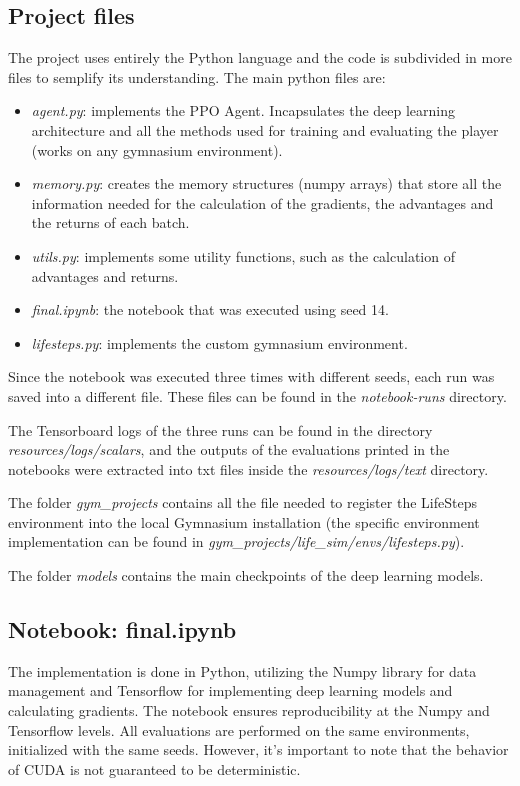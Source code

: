 \documentclass{article}
\begin{document}
\subsection{Project files}
The project uses entirely the Python language and the code is subdivided in more files to semplify its understanding. The main python files are:

\begin{itemize}
    \item \textit{agent.py}: implements the PPO Agent. Incapsulates the deep learning architecture and all the methods used for training and evaluating the player (works on any gymnasium environment).
    
    \item \textit{memory.py}: creates the memory structures (numpy arrays) that store all the information needed for the calculation of the gradients, the advantages and the returns of each batch.
    
    \item \textit{utils.py}: implements some utility functions, such as the calculation of advantages and returns.
    
    \item \textit{final.ipynb}: the notebook that was executed using seed 14.

    \item \textit{lifesteps.py}: implements the custom gymnasium environment.
\end{itemize}

Since the notebook was executed three times with different seeds, each run was saved into a different file. These files can be found in the \textit{notebook-runs} directory.

The Tensorboard logs of the three runs can be found in the directory \textit{resources/logs/scalars}, and the outputs of the evaluations printed in the notebooks were extracted into txt files inside the \textit{resources/logs/text} directory.

The folder \textit{gym\_projects} contains all the file needed to register the LifeSteps environment into the local Gymnasium installation (the specific environment implementation can be found in \textit{gym\_projects/life\_sim/envs/lifesteps.py}). 

The folder \textit{models} contains the main checkpoints of the deep learning models.

\subsection{Notebook: final.ipynb}
The implementation is done in Python, utilizing the Numpy library for data management and Tensorflow for implementing deep learning models and calculating gradients. The notebook ensures reproducibility at the Numpy and Tensorflow levels. All evaluations are performed on the same environments, initialized with the same seeds. However, it's important to note that the behavior of CUDA is not guaranteed to be deterministic.
\end{document}
